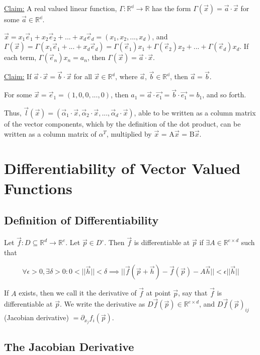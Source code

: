 \documentclass[11 pt, twoside]{article}
\begin{document}
\underline{Claim:} A real valued linear function, $\Gamma: \mathbb{R^d} \to \mathbb{R}$ has the form $\Gamma(\vec{x}) = \vec{a} \cdot \vec{x}$ for some $\vec{a} \in \mathbb{R^d}$.

$\vec{x} = x_1\vec{e}_1 + x_2\vec{e}_2 + ... + x_d\vec{e}_d = (x_1, x_2, ..., x_d)$, and $\Gamma(\vec{x}) = \Gamma(x_1\vec{e}_1 + ... + x_d\vec{e}_d) = \Gamma(\vec{e}_1)x_1 + \Gamma(\vec{e}_2)x_2 + ... + \Gamma(\vec{e}_d)x_d$. If each term, $\Gamma(\vec{e}_n)x_n = a_n$, then $\Gamma(\vec{x}) = \vec{a} \cdot \vec{x}$.

\underline{Claim:} If $\vec{a} \cdot \vec{x}  = \vec{b} \cdot \vec{x}$ for all $\vec{x} \in \mathbb{R^d}$, where $\vec{a}$, $\vec{b} \in \mathbb{R^d}$, then $\vec{a} = \vec{b}$.

For some $\vec{x} = \vec{e}_1 = (1, 0, 0, ..., 0)$, then $a_1 = \vec{a} \cdot \vec{e_1} = \vec{b} \cdot \vec{e_1} = b_1$, and so forth.

Thus, $\vec{l}(\vec{x}) = (\vec{\alpha}_1 \cdot \vec{x}, \vec{\alpha}_2 \cdot \vec{x}, ..., \vec{\alpha}_d \cdot \vec{x})$, able to be written as a column matrix of the vector components, which by the definition of the dot product, can be written as a column matrix of $\alpha^T$, multiplied by $\vec{x}$ = A$\vec{x}$ = B$\vec{x}$.

\section{Differentiability of Vector Valued Functions}
\subsection{Definition of Differentiability}
Let $\vec{f} : D \subseteq \mathbb{R}^d \to \mathbb{R}^e$. Let $\vec{p}
\in D^\circ$. Then $\vec{f}$ is differentiable at $\vec{p}$ if $\exists A \in
\mathbb{R}^{e \times d}$ such that

$$\boxed{\forall \epsilon > 0, \exists  \delta > 0: 0 < ||\vec{h}|| < \delta
\implies ||\vec{f}(\vec{p} + \vec{h}) - \vec{f}(\vec{p}) - A
\vec{h}|| < \epsilon ||\vec{h}||}$$

If $A$ exists, then we call it the derivative of $\vec{f}$ at point $\vec{p}$, say that $\vec{f}$ is differentiable at $\vec{p}$. We write the derivative as $D\vec{f}(\vec{p}) \in \mathbb{R}^{e \times d}$, and $D\vec{f}(\vec{p})_{ij}$ (Jacobian derivative) $= \partial_{x_j} f_i (\vec{p})$.

\subsection{The Jacobian Derivative}
\end{document}
